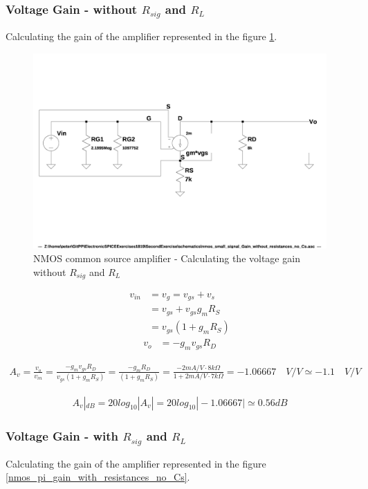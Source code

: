 \documentclass[10pt,a4paper]{book}
\begin{document}
\subsubsection{Voltage Gain - without $R_{sig}$ and $R_L$}
Calculating the gain of the amplifier represented in the figure \ref{nmos_pi_gain_without_resistances_no_Cs}.

\begin{figure}[h]
  \centering
  \includegraphics[width=12cm]{schematics/nmos_small_signal_without_resistances_no_Cs.jpg}
  \caption{NMOS common source amplifier - Calculating the voltage gain without $R_{sig}$ and $R_L$}
  \label{nmos_pi_gain_without_resistances_no_Cs}
\end{figure}

\begin{align}
v_{in} &= v_{g} = v_{gs}+v_s\\
&= v_{gs} + v_{gs} g_m R_S\\
&= v_{gs}(1+ g_m R_S)
\end{align}
\begin{align}
v_{o} &= - g_m v_{gs} R_D
\end{align}

\begin{align}
A_v = \frac{v_o}{v_{in}} = \frac{- g_m v_{gs} R_D}{v_{gs}(1+ g_m R_S)} = \frac{- g_m R_D}{(1+ g_m R_S)} = \frac{- 2mA/V \cdot 8k\Omega}{1+2mA/V \cdot 7k\Omega} = - 1.06667 \quad V/V \simeq - 1.1 \quad V/V
\end{align}

\begin{align}
A_v|_{dB} = 20 log_{10} |A_v| = 20 log_{10} |- 1.06667| \simeq 0.56 dB
\end{align}

\subsubsection{Voltage Gain - with $R_{sig}$ and $R_L$}
Calculating the gain of the amplifier represented in the figure \ref{nmos_pi_gain_with_resistances_no_Cs}.
\end{document}
